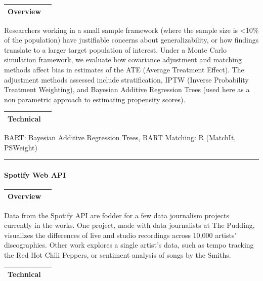 \documentclass[
]{article}
\begin{document}
\begin{longtable}[]{@{}lr@{}}
\toprule
Overview & \\
\midrule
\endhead
\bottomrule
\end{longtable}

Researchers working in a small sample framework (where the sample size
is \textless10\% of the population) have justifiable concerns about
generalizability, or how findings translate to a larger target
population of interest. Under a Monte Carlo simulation framework, we
evaluate how covariance adjustment and matching methods affect bias in
estimates of the ATE (Average Treatment Effect). The adjustment methods
assessed include stratification, IPTW (Inverse Probability Treatment
Weighting), and Bayesian Additive Regression Trees (used here as a non
parametric approach to estimating propensity scores).

\begin{longtable}[]{@{}lr@{}}
\toprule
Technical & \\
\midrule
\endhead
\bottomrule
\end{longtable}

BART: Bayesian Additive Regression Trees, BART Matching: R (MatchIt,
PSWeight)

\begin{center}\rule{0.5\linewidth}{0.5pt}\end{center}

\hypertarget{spotify-web-api}{%
\paragraph{Spotify Web API}\label{spotify-web-api}}

\begin{longtable}[]{@{}lr@{}}
\toprule
Overview & \\
\midrule
\endhead
\bottomrule
\end{longtable}

Data from the Spotify API are fodder for a few data journalism projects
currently in the works. One project, made with data journalists at The
Pudding, visualizes the differences of live and studio recordings across
10,000 artists' discographies. Other work explores a single artist's
data, such as tempo tracking the Red Hot Chili Peppers, or sentiment
analysis of songs by the Smiths.

\begin{longtable}[]{@{}lr@{}}
\toprule
Technical & \\
\midrule
\endhead
\bottomrule
\end{longtable}
\end{document}
